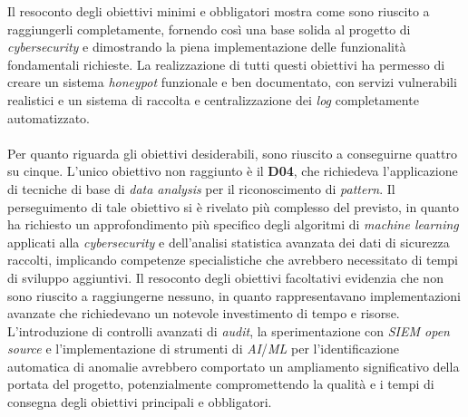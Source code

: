 \label{post-obiettivi-soddisfatti}
Il resoconto degli obiettivi minimi e obbligatori mostra come sono riuscito a raggiungerli completamente, fornendo così una base solida al progetto di \textit{cybersecurity} e dimostrando la piena implementazione delle funzionalità fondamentali richieste. La realizzazione di tutti questi obiettivi ha permesso di creare un sistema \textit{honeypot} funzionale e ben documentato, con servizi vulnerabili realistici e un sistema di raccolta e centralizzazione dei \textit{log} completamente automatizzato.\\\\
Per quanto riguarda gli obiettivi desiderabili, sono riuscito a conseguirne quattro su cinque. L'unico obiettivo non raggiunto è il \textbf{D04}, che richiedeva l'applicazione di tecniche di base di \textit{data analysis} per il riconoscimento di \textit{pattern}. Il perseguimento di tale obiettivo si è rivelato più complesso del previsto, in quanto ha richiesto un approfondimento più specifico degli algoritmi di \textit{machine learning} applicati alla \textit{cybersecurity} e dell'analisi statistica avanzata dei dati di sicurezza raccolti, implicando competenze specialistiche che avrebbero necessitato di tempi di sviluppo aggiuntivi.
Il resoconto degli obiettivi facoltativi evidenzia che non sono riuscito a raggiungerne nessuno, in quanto rappresentavano implementazioni avanzate che richiedevano un notevole investimento di tempo e risorse. L'introduzione di controlli avanzati di \textit{audit}, la sperimentazione con \textit{SIEM open source} e l'implementazione di strumenti di \textit{AI}/\textit{ML} per l'identificazione automatica di anomalie avrebbero comportato un ampliamento significativo della portata del progetto, potenzialmente compromettendo la qualità e i tempi di consegna degli obiettivi principali e obbligatori.

